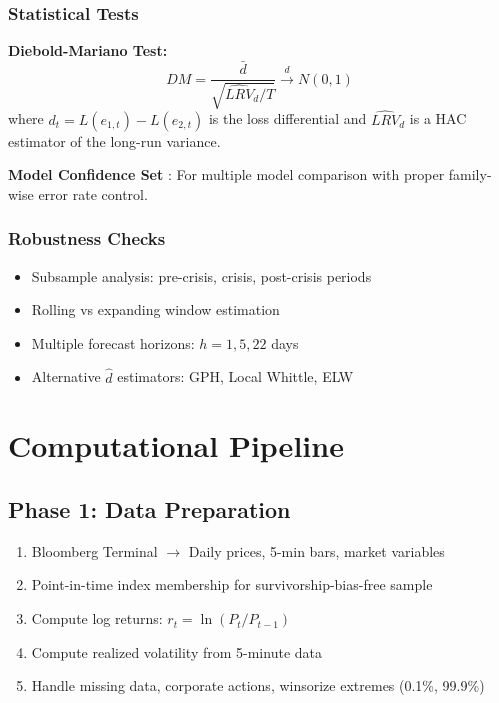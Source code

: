 \documentclass[11pt,a4paper]{article}
\theoremstyle{definition}
\newcommand{\dhat}{\hat{d}}
\begin{document}
\subsubsection{Statistical Tests}

\textbf{Diebold-Mariano Test:}
\begin{equation}
    DM = \frac{\bar{d}}{\sqrt{\widehat{LRV}_d / T}} \xrightarrow{d} N(0,1)
\end{equation}
where $d_t = L(e_{1,t}) - L(e_{2,t})$ is the loss differential and $\widehat{LRV}_d$ is a HAC estimator of the long-run variance.

\textbf{Model Confidence Set} \citep{hansen2011model}: For multiple model comparison with proper family-wise error rate control.

\subsubsection{Robustness Checks}

\begin{itemize}
    \item Subsample analysis: pre-crisis, crisis, post-crisis periods
    \item Rolling vs expanding window estimation
    \item Multiple forecast horizons: $h = 1, 5, 22$ days
    \item Alternative $\dhat$ estimators: GPH, Local Whittle, ELW
\end{itemize}

\section{Computational Pipeline}

\subsection{Phase 1: Data Preparation}

\begin{tcolorbox}[title=Data Extraction \& Preprocessing]
\begin{enumerate}
    \item Bloomberg Terminal $\to$ Daily prices, 5-min bars, market variables
    \item Point-in-time index membership for survivorship-bias-free sample
    \item Compute log returns: $r_t = \ln(P_t/P_{t-1})$
    \item Compute realized volatility from 5-minute data
    \item Handle missing data, corporate actions, winsorize extremes (0.1\%, 99.9\%)
\end{enumerate}
\end{tcolorbox}
\end{document}
